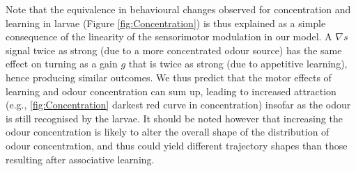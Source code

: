 \documentclass[11pt,a4paper]{article}
\begin{document}
Note that the equivalence in behavioural changes observed for concentration and learning in larvae (Figure \ref{fig:Concentration}) is thus explained as a simple consequence of the linearity of the sensorimotor modulation in our model. A $\nabla s$ signal twice as strong (due to a more concentrated odour source) has the same effect on turning as a gain $g$ that is twice as strong (due to appetitive learning), hence producing similar outcomes. We thus predict that the motor effects of learning and odour concentration can sum up, leading to increased attraction (e.g., \ref{fig:Concentration} darkest red curve in concentration) insofar as the odour is still recognised by the larvae. It should be noted however that increasing the odour concentration is likely to alter the overall shape of the distribution of odour concentration, and thus could yield different trajectory shapes than those resulting after associative learning.


\end{document}
